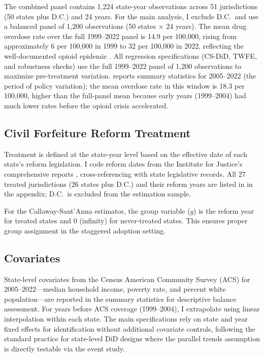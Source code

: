 \documentclass[12pt]{article}
\begin{document}
The combined panel contains 1,224 state-year observations across 51 jurisdictions (50 states plus D.C.) and 24 years. For the main analysis, I exclude D.C.\ and use a balanced panel of 1,200 observations (50 states $\times$ 24 years). The mean drug overdose rate over the full 1999--2022 panel is 14.9 per 100,000, rising from approximately 6 per 100,000 in 1999 to 32 per 100,000 in 2022, reflecting the well-documented opioid epidemic \citep{case2015rising, ruhm2019drivers}. All regression specifications (CS-DiD, TWFE, and robustness checks) use the full 1999--2022 panel of 1,200 observations to maximize pre-treatment variation.  reports summary statistics for 2005--2022 (the period of policy variation); the mean overdose rate in this window is 18.3 per 100,000, higher than the full-panel mean because early years (1999--2004) had much lower rates before the opioid crisis accelerated.

\subsection{Civil Forfeiture Reform Treatment}

Treatment is defined at the state-year level based on the effective date of each state's reform legislation. I code reform dates from the Institute for Justice's comprehensive reports \citep{ij2020policing, carpenter2019asset, ericksonburns2016}, cross-referencing with state legislative records. All 27 treated jurisdictions (26 states plus D.C.) and their reform years are listed in  in the appendix; D.C.\ is excluded from the estimation sample.

For the Callaway-Sant'Anna estimator, the group variable ($g$) is the reform year for treated states and 0 (infinity) for never-treated states. This ensures proper group assignment in the staggered adoption setting.

\subsection{Covariates}

State-level covariates from the Census American Community Survey (ACS) for 2005--2022---median household income, poverty rate, and percent white population---are reported in the summary statistics for descriptive balance assessment. For years before ACS coverage (1999--2004), I extrapolate using linear interpolation within each state. The main specifications rely on state and year fixed effects for identification without additional covariate controls, following the standard practice for state-level DiD designs where the parallel trends assumption is directly testable via the event study.
\end{document}
